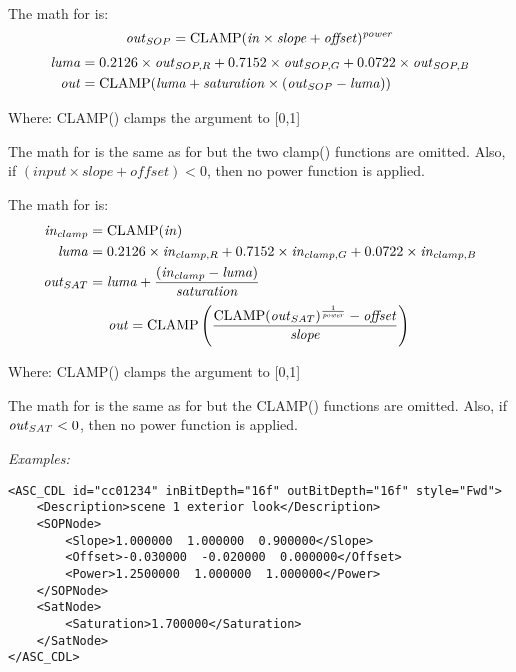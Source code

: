 The math for  is:
\begin{equation} \label{eq:cdl-fwd}
    \text{\emph{out}}_{SOP} = \mathrm{CLAMP}(\text{\emph{in}} \times \text{\emph{slope}} + \text{\emph{offset}})^{\text{\emph{power}}} \\
\end{equation}
\begin{equation}
    \begin{aligned}
        \text{\emph{luma}} &= 0.2126 \times \text{\emph{out}}_{SOP,R} + 0.7152 \times \text{\emph{out}}_{SOP,G} + 0.0722 \times \text{\emph{out}}_{SOP,B} \\
        \text{\emph{out}} &= \mathrm{CLAMP}(\text{\emph{luma}} + \text{\emph{saturation}} \times (\text{\emph{out}}_{SOP} - \text{\emph{luma}}))
    \end{aligned}
\end{equation}

\tabto{0.5in}Where:
\tabto{0.75in} CLAMP() clamps the argument to [0,1]

The math for  is the same as for  but the two clamp() functions are omitted. Also, if $(input \times slope + offset) < 0$, then no power function is applied.

The math for  is:
\begin{equation}
    \begin{aligned}
        \text{\emph{in}}_{clamp} &= \mathrm{CLAMP}(\text{\emph{in}}) \\
        \text{\emph{luma}} &= 0.2126 \times \text{\emph{in}}_{clamp,R} + 0.7152 \times \text{\emph{in}}_{clamp,G} + 0.0722 \times \text{\emph{in}}_{clamp,B} \\
        \text{\emph{out}}_{SAT} &= \text{\emph{luma}} + \frac{(\text{\emph{in}}_{clamp} - \text{\emph{luma}})}{\text{\emph{saturation}}}
    \end{aligned}
\end{equation}
\begin{equation}  \label{eq:cdl-rev}
    \text{\emph{out}} = \mathrm{CLAMP}\left(\frac{\mathrm{CLAMP}(\text{\emph{out}}_{SAT})^{\frac{1}{\text{\emph{power}}}} - \text{\emph{offset}}}{\text{\emph{slope}}}\right) \\
\end{equation}

\tabto{0.5in}Where:
\tabto{0.75in} CLAMP() clamps the argument to [0,1]

The math for  is the same as for  but the CLAMP() functions are omitted. Also, if $\text{\emph{out}}_{SAT} < 0$, then no power function is applied.

\emph{Examples:}
\begin{lstlisting}[caption=Example of an \xml{ASC\_CDL} node,label=ex:asccdl]
<ASC_CDL id="cc01234" inBitDepth="16f" outBitDepth="16f" style="Fwd">
    <Description>scene 1 exterior look</Description>
    <SOPNode>
        <Slope>1.000000  1.000000  0.900000</Slope>
        <Offset>-0.030000  -0.020000  0.000000</Offset>
        <Power>1.2500000  1.000000  1.000000</Power>
    </SOPNode>
    <SatNode>
        <Saturation>1.700000</Saturation>
    </SatNode>
</ASC_CDL>
\end{lstlisting}
